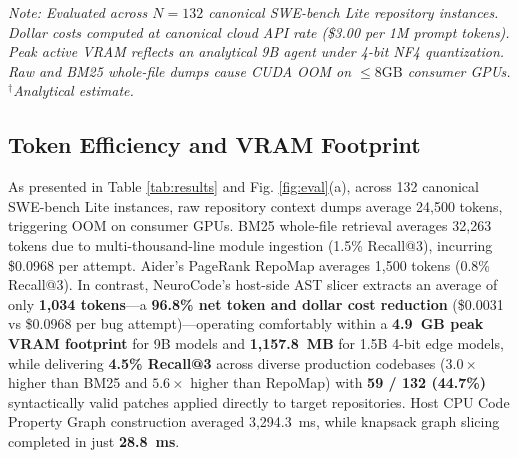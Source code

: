 \documentclass[conference]{IEEEtran}
\begin{document}
\begin{table}[h]
\centering
\caption{Comparative Context Footprint and Retrieval Performance on 132 SWE-bench Lite Instances}
\label{tab:results}
\vspace{1mm}
\footnotesize{\textit{Note: Evaluated across $N=132$ canonical SWE-bench Lite repository instances. Dollar costs computed at canonical cloud API rate (\$3.00 per 1M prompt tokens). Peak active VRAM reflects an analytical 9B agent under 4-bit NF4 quantization. Raw and BM25 whole-file dumps cause CUDA OOM on $\le 8\text{GB}$ consumer GPUs. $^\dagger$Analytical estimate.}}
\end{table}

\subsection{Token Efficiency and VRAM Footprint}
As presented in Table \ref{tab:results} and Fig. \ref{fig:eval}(a), across 132 canonical SWE-bench Lite instances, raw repository context dumps average 24,500 tokens, triggering OOM on consumer GPUs. BM25 whole-file retrieval averages 32,263 tokens due to multi-thousand-line module ingestion (1.5\% Recall@3), incurring \$0.0968 per attempt. Aider's PageRank RepoMap averages 1,500 tokens (0.8\% Recall@3). In contrast, NeuroCode's host-side AST slicer extracts an average of only \textbf{1,034 tokens}---a \textbf{96.8\% net token and dollar cost reduction} (\$0.0031 vs \$0.0968 per bug attempt)---operating comfortably within a \textbf{4.9~GB peak VRAM footprint} for 9B models and \textbf{1,157.8~MB} for 1.5B 4-bit edge models, while delivering \textbf{4.5\% Recall@3} across diverse production codebases ($3.0\times$ higher than BM25 and $5.6\times$ higher than RepoMap) with \textbf{59 / 132 (44.7\%)} syntactically valid patches applied directly to target repositories. Host CPU Code Property Graph construction averaged 3,294.3~ms, while knapsack graph slicing completed in just \textbf{28.8~ms}.
\end{document}

